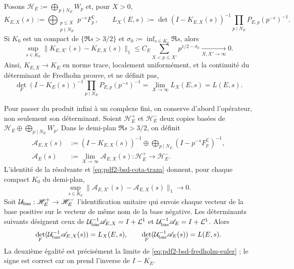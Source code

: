 Posons $\mathscr H_E:=\widehat\bigoplus_{p\nmid N_E}W_p$ et, pour $X>0$,
\begin{equation}\label{eq:pdf2-bsd-truncados-fredholm}
 K_{E,X}(s):=\bigoplus_{\substack{p\leq X\\p\nmid N_E}}
          p^{-s}F_p^{\mathbb C},
 \qquad
 L_X(E,s):=\det(I-K_{E,X}(s))^{-1}
       \prod_{p\mid N_E}P_{E,p}(p^{-s})^{-1}.
\end{equation}
Si $K_0$ est un compact de $\{\Re s>3/2\}$ et
$\sigma_0:=\inf_{s\in K_0}\Re s$, alors
\begin{equation}\label{eq:pdf2-bsd-cota-traza}
 \sup_{s\in K_0}\|K_{E,X'}(s)-K_{E,X}(s)\|_1
 \leq C_E\sum_{X<p\leq X'}p^{1/2-\sigma_0}
 \xrightarrow[X,X'\to\infty]{}0.
\end{equation}
Ainsi, $K_{E,X}\to K_E$ en norme trace, localement uniformément, et la
continuité du déterminant de Fredholm prouve, et ne définit pas,
\begin{equation}\label{eq:pdf2-bsd-fredholm-euler}
 \det_F(I-K_E(s))^{-1}
 \prod_{p\mid N_E}P_{E,p}(p^{-s})^{-1}
 =\lim_{X\to\infty}L_X(E,s)=L(E,s).
\end{equation}

Pour passer du produit infini à un complexe fini, on conserve d'abord
l'opérateur, non seulement son déterminant. Soient $\mathscr H_E^+$ et
$\mathscr H_E^-$ deux copies basées de
$\mathscr H_E\oplus\bigoplus_{p\mid N_E}W_p$. Dans le demi-plan
$\Re s>3/2$, on définit
\begin{equation}\label{eq:pdf2-bsd-operadores-euler-inversos}
 \begin{aligned}
  \mathscr A_{E,X}(s)&:=
   (I-K_{E,X}(s))^{-1}\oplus
   \bigoplus_{p\mid N_E}(I-p^{-s}F_p^{\mathbb C})^{-1},\\
  \mathscr A_E(s)&:=\lim_{X\to\infty}\mathscr A_{E,X}(s):
       \mathscr H_E^+\longrightarrow\mathscr H_E^-.
 \end{aligned}
\end{equation}
L'identité de la résolvante et \eqref{eq:pdf2-bsd-cota-traza} donnent, pour chaque
compact $K_0$ du demi-plan,
\begin{equation}\label{eq:pdf2-bsd-resolvente-convergencia-traza}
 \sup_{s\in K_0}
 \|\mathscr A_{E,X'}(s)-\mathscr A_{E,X}(s)\|_1\longrightarrow0.
\end{equation}
Soit $\mathcal U_{\rm bas}:\mathscr H_E^+\to\mathscr H_E^-$ l'identification unitaire qui
envoie chaque vecteur de la base positive sur le vecteur de même nom de la base
négative. Les déterminants suivants désignent ceux de
$\mathcal U_{\rm bas}^{-1}\mathscr A_{E,X}=I+\mathcal L^1$ et
$\mathcal U_{\rm bas}^{-1}\mathscr A_E=I+\mathcal L^1$. Alors
\begin{equation}\label{eq:pdf2-bsd-det-a-x-l-x}
 \det_F(\mathcal U_{\rm bas}^{-1}\mathscr A_{E,X}(s))=L_X(E,s),
 \qquad
 \det_F(\mathcal U_{\rm bas}^{-1}\mathscr A_E(s))=L(E,s).
\end{equation}
La deuxième égalité est précisément la limite de
\eqref{eq:pdf2-bsd-fredholm-euler} ; le signe est correct car on prend
l'inverse de $I-K_E$.

